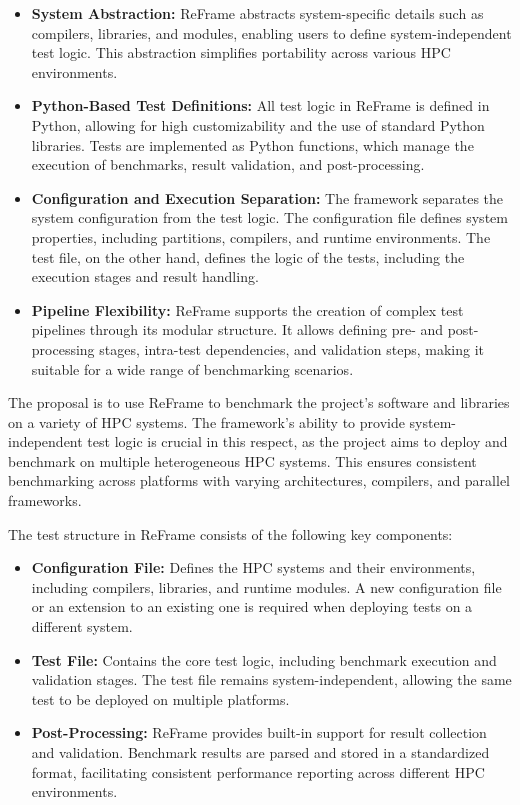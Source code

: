\begin{itemize}
    \item \textbf{System Abstraction:} ReFrame abstracts system-specific details such as compilers, libraries, and modules, enabling users to define system-independent test logic. This abstraction simplifies portability across various HPC environments.
    \item \textbf{Python-Based Test Definitions:} All test logic in ReFrame is defined in Python, allowing for high customizability and the use of standard Python libraries. Tests are implemented as Python functions, which manage the execution of benchmarks, result validation, and post-processing.
    \item \textbf{Configuration and Execution Separation:} The framework separates the system configuration from the test logic. The configuration file defines system properties, including partitions, compilers, and runtime environments. The test file, on the other hand, defines the logic of the tests, including the execution stages and result handling.
    \item \textbf{Pipeline Flexibility:} ReFrame supports the creation of complex test pipelines through its modular structure. It allows defining pre- and post-processing stages, intra-test dependencies, and validation steps, making it suitable for a wide range of benchmarking scenarios.
\end{itemize}


The proposal is to use ReFrame  to benchmark the project's software and libraries on a variety of HPC systems. 
The framework’s ability to provide system-independent test logic is crucial in this respect, as the project aims to deploy and benchmark  on multiple heterogeneous HPC systems. 
This ensures consistent benchmarking across platforms with varying architectures, compilers, and parallel frameworks.

The test structure in ReFrame consists of the following key components:

\begin{itemize}
    \item \textbf{Configuration File:} Defines the HPC systems and their environments, including compilers, libraries, and runtime modules. A new configuration file or an extension to an existing one is required when deploying tests on a different system.
    \item \textbf{Test File:} Contains the core test logic, including benchmark execution and validation stages. The test file remains system-independent, allowing the same test to be deployed on multiple platforms.
    \item \textbf{Post-Processing:} ReFrame provides built-in support for result collection and validation. Benchmark results are parsed and stored in a standardized format, facilitating consistent performance reporting across different HPC environments.
\end{itemize}

